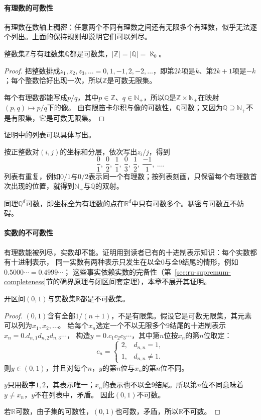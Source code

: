 \paragraph{有理数的可数性}
有理数在数轴上稠密：任意两个不同有理数之间还有无限多个有理数，似乎无法逐个列出。上面的保持规则却说明它们可以列尽。
\begin{theorem}[有理数可数]
\label{thm:card-rationals-countable}
整数集$\mathbb Z$与有理数集$\mathbb Q$都是可数集，$|\mathbb Z|=|\mathbb Q|=\aleph_0$。
\end{theorem}
\begin{proof}
把整数排成$z_1,z_2,z_3,\ldots=0,1,-1,2,-2,\ldots$，即第$2k$项是$k$、第$2k+1$项是$-k$；每个整数恰好出现一次，所以$\mathbb Z$是可数无限集。

每个有理数都能写成$p/q$，其中$p\in\mathbb Z$、$q\in\mathbb N_+$，所以$\mathbb Q$是$\mathbb Z\times\mathbb N_+$在映射$(p,q)\mapsto p/q$下的像。
由有限笛卡尔积与像的可数性，$\mathbb Q$可数；又因为$\mathbb Q\supseteq\mathbb N_+$不是有限集，它是可数无限集。
\end{proof}
证明中的列表可以具体写出。
\begin{example}[有理数的一份列表]
\label{ex:card-rationals-listing}
按正整数对$(i,j)$的坐标和分层，依次写出$z_i/j$，得到
\[
 \frac{0}{1},\ \frac{0}{2},\ \frac{1}{1},\ \frac{0}{3},\ \frac{1}{2},\ \frac{-1}{1},\ \ldots.
\]
列表有重复，例如$0/1$与$0/2$表示同一个有理数；按列表刻画，只保留每个有理数首次出现的位置，就得到$\mathbb N_+$与$\mathbb Q$的双射。
\end{example}
同理$\mathbb Q^d$可数，即坐标全为有理数的点在$\mathbb R^d$中只有可数多个。稠密与可数互不妨碍。

\paragraph{实数的不可数性}
\label{sec:comb-real-uncountable}
有理数能被列尽，实数却不能。证明用到读者已有的十进制表示知识：每个实数都有十进制表示，
同一实数有两种表示只发生在以全$0$与全$9$结尾的情形，例如$0.5000\cdots=0.4999\cdots$；
这些事实依赖实数的完备性（第~\ref{sec:ru-supremum-completeness}节的确界原理与闭区间套定理），本章不展开其证明。
\begin{theorem}[实数不可数]
\label{thm:card-reals-uncountable}
开区间$(0,1)$与实数集$\mathbb R$都是不可数集。
\end{theorem}
\begin{proof}
$(0,1)$含有全部$1/(n+1)$，不是有限集。假设它是可数无限集，其元素可以列为$x_1,x_2,\ldots$。
给每个$x_n$选定一个不以无限多个$9$结尾的十进制表示$x_n=0.d_{n,1}d_{n,2}d_{n,3}\cdots$，
构造$y=0.c_1c_2c_3\cdots$，其中第$n$位按$x_n$的第$n$位取定：
\[
 c_n=
 \begin{cases}
  2, & d_{n,n}=1,\\
  1, & d_{n,n}\neq1.
 \end{cases}
\]
则$y\in(0,1)$，并且对每个$n$，$y$的第$n$位与$x_n$的第$n$位不同。

$y$只用数字$1,2$，其表示唯一；$x_n$的表示也不以全$9$结尾。所以第$n$位不同意味着$y\neq x_n$，$y$不在列表中，矛盾。
因此$(0,1)$不可数。

若$\mathbb R$可数，由子集的可数性，$(0,1)$也可数，矛盾，所以$\mathbb R$不可数。
\end{proof}

